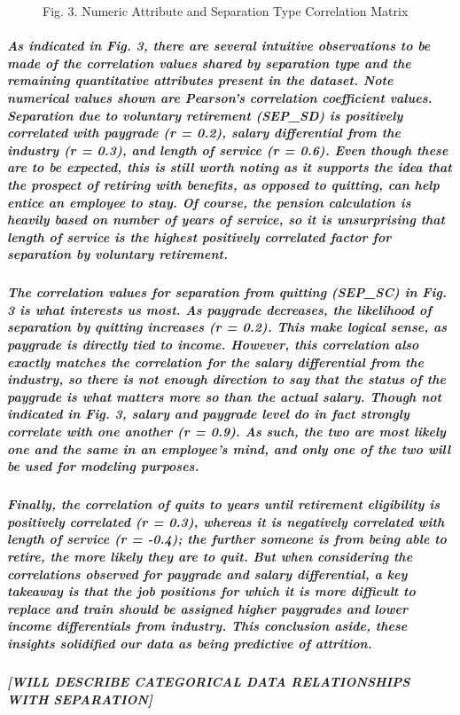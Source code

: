 \documentclass{article}
\begin{document}
\begin{figure}
\caption{Fig. 3. Numeric Attribute and Separation Type Correlation Matrix}
\end{figure}
 
\subparagraph{As indicated in Fig. 3, there are several intuitive observations to be made of the correlation values shared by separation type and the remaining quantitative attributes present in the dataset. Note numerical values shown are Pearson’s correlation coefficient values. Separation due to voluntary retirement (SEP\_SD) is positively correlated with paygrade (r = 0.2), salary differential from the industry (r = 0.3), and length of service (r = 0.6). Even though these are to be expected, this is still worth noting as it supports the idea that the prospect of retiring with benefits, as opposed to quitting, can help entice an employee to stay. Of course, the pension calculation is heavily based on number of years of service, so it is unsurprising that length of service is the highest positively correlated factor for separation by voluntary retirement.}
 
\subparagraph{The correlation values for separation from quitting (SEP\_SC) in Fig. 3 is what interests us most.  As paygrade decreases, the likelihood of separation by quitting increases (r = 0.2). This make logical sense, as paygrade is directly tied to income.  However, this correlation also exactly matches the correlation for the salary differential from the industry, so there is not enough direction to say that the status of the paygrade is what matters more so than the actual salary. Though not indicated in Fig. 3, salary and paygrade level do in fact strongly correlate with one another (r = 0.9). As such, the two are most likely one and the same in an employee's mind, and only one of the two will be used for modeling purposes.}
 
\subparagraph{Finally, the correlation of quits to years until retirement eligibility is positively correlated (r = 0.3), whereas it is negatively correlated with length of service (r = -0.4); the further someone is from being able to retire, the more likely they are to quit. But when considering the correlations observed for paygrade and salary differential, a key takeaway is that the job positions for which it is more difficult to replace and train should be assigned higher paygrades and lower income differentials from industry. This conclusion aside, these insights solidified our data as being predictive of attrition.}

\subparagraph{[WILL DESCRIBE CATEGORICAL DATA RELATIONSHIPS WITH SEPARATION]}
\end{document}
